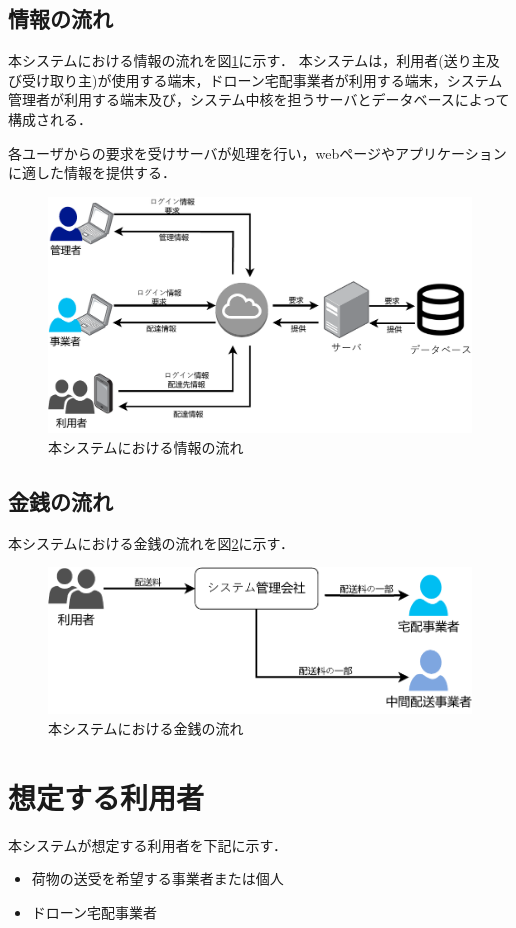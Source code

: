 \documentclass[a4paper, titlepage]{jsarticle}
\begin{document}
\subsection{情報の流れ}
本システムにおける情報の流れを図\ref{fig:info_flow_1}に示す．
本システムは，利用者(送り主及び受け取り主)が使用する端末，ドローン宅配事業者が利用する端末，システム管理者が利用する端末及び，システム中核を担うサーバとデータベースによって構成される．

各ユーザからの要求を受けサーバが処理を行い，webページやアプリケーションに適した情報を提供する．

\begin{figure}[H]
        \centering
        \includegraphics[width=0.6\linewidth]{./info_flow.pdf}
        \caption{本システムにおける情報の流れ}
        \label{fig:info_flow_1}
\end{figure}

\subsection{金銭の流れ}
本システムにおける金銭の流れを図\ref{fig:money_flow_1}に示す．

\begin{figure}[H]
        \centering
        \includegraphics[width=0.6\linewidth]{./money_flow.pdf}
        \caption{本システムにおける金銭の流れ}
        \label{fig:money_flow_1}
\end{figure}


\section{想定する利用者}
本システムが想定する利用者を下記に示す．
\begin{itemize}
        \item 荷物の送受を希望する事業者または個人
        \item ドローン宅配事業者
\end{itemize}
\end{document}
